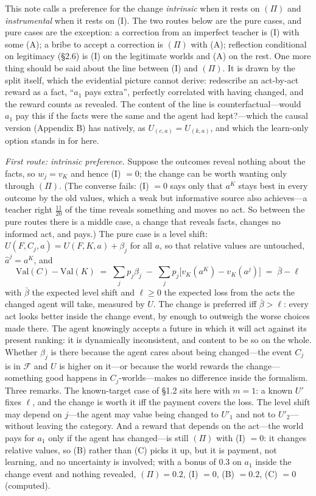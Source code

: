 \documentclass[11pt,a4paper]{article}
\begin{document}
This note calls a preference for the change \emph{intrinsic} when it rests on $(\Pi)$ and \emph{instrumental} when it rests on (I). The two routes below are the pure cases, and pure cases are the exception: a correction from an imperfect teacher is (I) with some (A); a bribe to accept a correction is $(\Pi)$ with (A); reflection conditional on legitimacy (\S2.6) is (I) on the legitimate worlds and (A) on the rest. One more thing should be said about the line between (I) and $(\Pi)$. It is drawn by the split itself, which the evidential picture cannot derive: redescribe an act-by-act reward as a fact, ``$a_1$ pays extra'', perfectly correlated with having changed, and the reward counts as revealed. The content of the line is counterfactual---would $a_1$ pay this if the facts were the same and the agent had kept?---which the causal version (Appendix B) has natively, as $U_{(c,a)} = U_{(k,a)}$, and which the learn-only option stands in for here.

\emph{First route: intrinsic preference.} Suppose the outcomes reveal nothing about the facts, so $w_j = v_K$ and hence (I) $= 0$; the change can be worth wanting only through $(\Pi)$. (The converse fails: (I) $= 0$ says only that $a^K$ stays best in every outcome by the old values, which a weak but informative source also achieves---a teacher right $\tfrac{11}{20}$ of the time reveals something and moves no act. So between the pure routes there is a middle case, a change that reveals facts, changes no informed act, and pays.) The pure case is a level shift: $U(F, C_j, a) = U(F, K, a) + \beta_j$ for all $a$, so that relative values are untouched, $\hat a^j = a^K$, and
\[
\mathrm{Val}(C) - \mathrm{Val}(K) \;=\; \sum_j p_j \beta_j \;-\; \sum_j p_j \bigl[ v_K(a^K) - v_K(a^j)\bigr] \;=\; \bar\beta - \ell
\]
with $\bar\beta$ the expected level shift and $\ell \ge 0$ the expected loss from the acts the changed agent will take, measured by $U$. The change is preferred iff $\bar\beta > \ell$: every act looks better inside the change event, by enough to outweigh the worse choices made there. The agent knowingly accepts a future in which it will act against its present ranking: it is dynamically inconsistent, and content to be so on the whole. Whether $\beta_j$ is there because the agent cares about being changed---the event $C_j$ is in $\mathcal F$ and $U$ is higher on it---or because the world rewards the change---something good happens in $C_j$-worlds---makes no difference inside the formalism. Three remarks. The known-target case of \S1.2 sits here with $m = 1$: a known $U'$ fixes $\ell$, and the change is worth it iff the payment covers the loss. The level shift may depend on $j$---the agent may value being changed to $U'_1$ and not to $U'_2$---without leaving the category. And a reward that depends on the act---the world pays for $a_1$ only if the agent has changed---is still $(\Pi)$ with (I) $= 0$: it changes relative values, so (B) rather than (C) picks it up, but it is payment, not learning, and no uncertainty is involved; with a bonus of $0.3$ on $a_1$ inside the change event and nothing revealed, $(\Pi) = 0.2$, (I) $= 0$, (B) $= 0.2$, (C) $= 0$ (computed).
\end{document}
